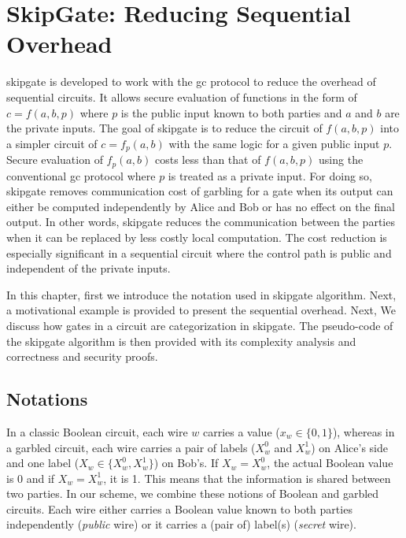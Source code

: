 \chapter{{SkipGate}: Reducing Sequential Overhead}\label{chap:skipgate}
\gls{skipgate} is developed to work with the \acrshort{gc} protocol to reduce the overhead of sequential circuits.
It allows secure evaluation of functions in the form of $c = f(a, b, p)$ where $p$ is the public input known to both parties and $a$ and $b$ are the private inputs.
The goal of \gls{skipgate} is to reduce the circuit of $f(a, b, p)$ into a simpler circuit of $c = f_p(a,b)$ with the same logic for a given public input $p$.
Secure evaluation of $f_p(a,b)$ costs less than that of $f(a, b, p)$ using the conventional \acrshort{gc} protocol where $p$ is treated as a private input.
For doing so, \gls{skipgate} removes communication cost of garbling for a gate when its output can either be computed independently by Alice and Bob or has no effect on the final output.
In other words, \gls{skipgate} reduces the communication between the parties when it can be replaced by less costly local computation.
The cost reduction is especially significant in a sequential circuit where the control path is public and independent of the private inputs.

In this chapter, first we introduce the notation used in \gls{skipgate} algorithm.
Next, a motivational example is provided to present the sequential overhead.
Next, We discuss how gates in a circuit are categorization in \gls{skipgate}.
The pseudo-code of the \gls{skipgate} algorithm is then provided with its complexity analysis and correctness and security proofs.

\section{Notations}\label{sec:skipgate-notation}
In a classic Boolean circuit, each wire $w$ carries a value ($x_w\in\{0, 1\}$), whereas in a garbled circuit, each wire carries a pair of labels ($X_w^{0}$ and $X_w^{1}$) on Alice's side and one label ($X_w \in \{X_w^{0}, X_w^{1}\}$) on Bob's.
If $X_w = X_w^{0}$, the actual Boolean value is 0 and if $X_w = X_w^{1}$, it is 1.
This means that the information is shared between two parties.
In our scheme, we combine these notions of Boolean and garbled circuits.
Each wire either carries a Boolean value known to both parties independently (\textit{public} wire) or it carries a (pair of) label(s) (\textit{secret} wire).

